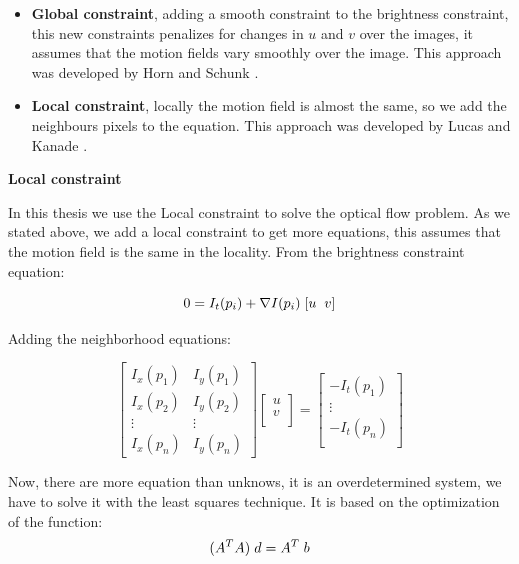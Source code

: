 \begin{itemize}

\item \textbf{Global constraint}, adding a smooth constraint to the brightness constraint, this new constraints penalizes for changes in $u$ and $v$ over the images, it assumes that the motion fields vary smoothly over the image. This approach was developed by Horn and Schunk \cite{horn}.

\item \textbf{Local constraint}, locally the motion field is almost the same, so we add the neighbours pixels to the equation. This approach was developed by Lucas and Kanade \cite{LucasKana}.
\end{itemize}



\textbf{Local constraint}

In this thesis we use the Local constraint to solve the optical flow problem. As we stated above, we add a local constraint to get more equations, this assumes that the motion field is the same in the locality. From the brightness constraint equation:

$$ 0 = I_{t}(p_{i}) + \nabla I(p_{i}) \hspace{0.1cm} [u \hspace{0.2cm} v]$$

Adding the neighborhood equations:


\[
\begin{bmatrix}
    I_{x}(p_{1}) & I_{y}(p_{1})  \\
    I_{x}(p_{2}) & I_{y}(p_{2})  \\
    \vdots & \vdots  \\
    I_{x}(p_{n}) & I_{y}(p_{n})
\end{bmatrix}
\begin{bmatrix}
    u \\
    v \\
\end{bmatrix}
=
\begin{bmatrix}
    -I_{t}(p_{1}) \\
    \vdots \\
    -I_{t}(p_{n}) \\
\end{bmatrix}
\]


Now, there are more equation than unknows, it is an overdetermined system, we have to solve it with the least squares technique. It is based on the optimization of the function:
$$(A^{T}A) \hspace{0.1cm} d=A^{T} \hspace{0.1cm} b$$

